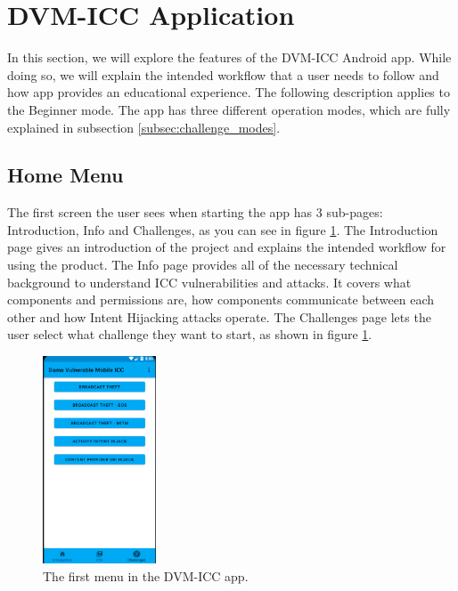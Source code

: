     \section{DVM-ICC Application}
        \label{sec:home_app}
        
    In this section, we will explore the features of the DVM-ICC Android app. While doing so, we will explain the intended workflow that a user needs to follow and how app provides an educational experience. The following description applies to the Beginner mode. The app has three different operation modes, which are fully explained in subsection \ref{subsec:challenge_modes}.
    
    \subsection{Home Menu}
        \label{subsec:home_menu}
        
    The first screen the user sees when starting the app has 3 sub-pages: Introduction, Info and Challenges, as you can see in figure \ref{fig:home_menu}. The Introduction page gives an introduction of the project and explains the intended workflow for using the product. The Info page provides all of the necessary technical background to understand ICC vulnerabilities and attacks. It covers what components and permissions are, how components communicate between each other and how Intent Hijacking attacks operate. The Challenges page lets the user select what challenge they want to start, as shown in figure \ref{fig:home_menu}.
    
    \begin{figure}
        \centering
        \includegraphics[width=0.3\textwidth]{graphics/home_activity.PNG}
        \caption{The first menu in the DVM-ICC app.}
        \label{fig:home_menu}
    \end{figure}
    
